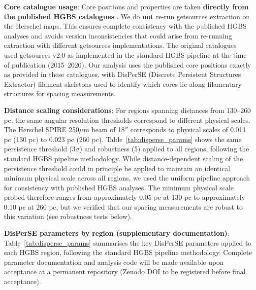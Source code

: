 \documentclass[11pt,a4paper]{article}
\begin{document}
\textbf{Core catalogue usage}: Core positions and properties are taken \textbf{directly from the published HGBS catalogues} \citep{Konyves2015, Konyves2020, Andre2016}. We do \textbf{not} re-run getsources extraction on the Herschel maps. This ensures complete consistency with the published HGBS analyses and avoids version inconsistencies that could arise from re-running extraction with different getsources implementations. The original catalogues used getsources v2.0 as implemented in the standard HGBS pipeline at the time of publication (2015--2020). Our analysis uses the published core positions exactly as provided in these catalogues, with DisPerSE (Discrete Persistent Structures Extractor) \citep{Sousbie2011} filament skeletons used to identify which cores lie along filamentary structures for spacing measurements.

\textbf{Distance scaling considerations}: For regions spanning distances from 130--260 pc, the same angular resolution thresholds correspond to different physical scales. The Herschel SPIRE 250$\mu$m beam of 18$''$ corresponds to physical scales of 0.011 pc (130 pc) to 0.023 pc (260 pc). Table~\ref{tab:disperse_params} shows the same persistence threshold ($3\sigma$) and robustness (5) applied to all regions, following the standard HGBS pipeline methodology. While distance-dependent scaling of the persistence threshold could in principle be applied to maintain an identical minimum physical scale across all regions, we used the uniform pipeline approach for consistency with published HGBS analyses. The minimum physical scale probed therefore ranges from approximately 0.05 pc at 130 pc to approximately 0.10 pc at 260 pc, but we verified that our spacing measurements are robust to this variation (see robustness tests below).

\textbf{DisPerSE parameters by region (supplementary documentation)}: Table~\ref{tab:disperse_params} summarises the key DisPerSE parameters applied to each HGBS region, following the standard HGBS pipeline methodology. Complete parameter documentation and analysis code will be made available upon acceptance at a permanent repository (Zenodo DOI to be registered before final acceptance).
\end{document}
